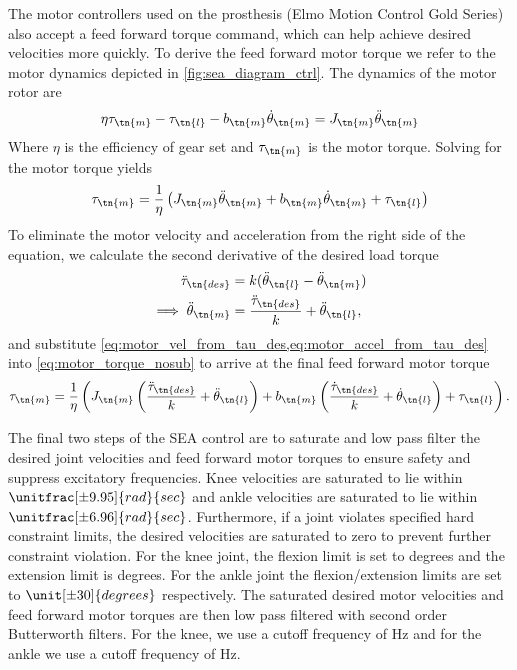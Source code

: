 The motor controllers used on the prosthesis (Elmo Motion Control Gold Series)
also accept a feed forward torque command, which can help achieve desired
velocities more quickly. To derive the feed forward motor torque we refer to the
motor dynamics depicted in \cref{fig:sea_diagram_ctrl}. The dynamics of the
motor rotor are
\begin{align}
    \eta \tau_\tn{m} - \tau_\tn{l} - b_\tn{m} \dot \theta_\tn{m} 
        = J_\tn{m} \ddot \theta_\tn{m}
\end{align}
Where $\eta$ is the efficiency of gear set and $\tau_\tn{m}$ is the motor
torque. Solving for the motor torque yields
\begin{align}
    \tau_\tn{m} = \frac{1}{\eta} \left( J_\tn{m} \ddot \theta_\tn{m} 
        + b_\tn{m} \dot \theta_\tn{m} + \tau_\tn{l} \right)
    \label{eq:motor_torque_nosub}
\end{align}
To eliminate the motor velocity and acceleration from the right side of the
equation, we calculate the second derivative of the desired load torque
\begin{align}
    \ddot \tau_\tn{des} &= k (\ddot \theta_\tn{l} - \ddot \theta_\tn{m}) \\
    \implies \ddot \theta_\tn{m} &= \frac{\ddot \tau_\tn{des}}{k} 
        + \ddot \theta_\tn{l},\label{eq:motor_accel_from_tau_des}
\end{align}
and substitute \cref{eq:motor_vel_from_tau_des,eq:motor_accel_from_tau_des} into
\cref{eq:motor_torque_nosub} to arrive at the final feed forward motor torque
\begin{align}
    \tau_\tn{m} = \frac{1}{\eta} \left( J_\tn{m} 
        \left( \frac{\ddot \tau_\tn{des}}{k} + \ddot \theta_\tn{l} \right)
        + b_\tn{m} \left(\frac{\dot \tau_\tn{des}}{k} + \dot \theta_\tn{l}\right)
        + \tau_\tn{l} \right).
\end{align}

The final two steps of the SEA control are to saturate and low pass filter the
desired joint velocities and feed forward motor torques to ensure safety and
suppress excitatory frequencies. Knee velocities are saturated to lie within
$\unitfrac[\pm 9.95]{rad}{sec}$ and ankle velocities are saturated to lie within
$\unitfrac[\pm 6.96]{rad}{sec}$. Furthermore, if a joint violates specified hard
constraint limits, the desired velocities are saturated to zero to prevent
further constraint violation. For the knee joint, the flexion limit is set to
\unit[90]{degrees} and the extension limit is \unit[-2]{degrees}. For the ankle
joint the flexion/extension limits are set to $\unit[\pm 30]{degrees}$
respectively. The saturated desired motor velocities and feed forward motor
torques are then low pass filtered with second order Butterworth filters. For
the knee, we use a cutoff frequency of \unit[100]{Hz} and for the ankle we use a
cutoff frequency of \unit[50]{Hz}.
